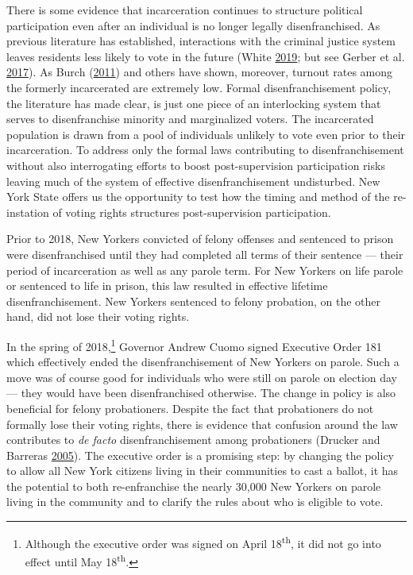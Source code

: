 \documentclass[
  12pt,
]{article}
\begin{document}
There is some evidence that incarceration continues to structure political participation even after an individual is no longer legally disenfranchised. As previous literature has established, interactions with the criminal justice system leaves residents less likely to vote in the future (White \protect\hyperlink{ref-White2019}{2019}; but see Gerber et al. \protect\hyperlink{ref-Gerber2017}{2017}). As Burch (\protect\hyperlink{ref-Burch2011}{2011}) and others have shown, moreover, turnout rates among the formerly incarcerated are extremely low. Formal disenfranchisement policy, the literature has made clear, is just one piece of an interlocking system that serves to disenfranchise minority and marginalized voters. The incarcerated population is drawn from a pool of individuals unlikely to vote even prior to their incarceration. To address only the formal laws contributing to disenfranchisement without also interrogating efforts to boost post-supervision participation risks leaving much of the system of effective disenfranchisement undisturbed. New York State offers us the opportunity to test how the timing and method of the re-instation of voting rights structures post-supervision participation.

Prior to 2018, New Yorkers convicted of felony offenses and sentenced to prison were disenfranchised until they had completed all terms of their sentence --- their period of incarceration as well as any parole term. For New Yorkers on life parole or sentenced to life in prison, this law resulted in effective lifetime disenfranchisement. New Yorkers sentenced to felony probation, on the other hand, did not lose their voting rights.

In the spring of 2018,\footnote{Although the executive order was signed on April 18\textsuperscript{th}, it did not go into effect until May 18\textsuperscript{th}.} Governor Andrew Cuomo signed Executive Order 181 which effectively ended the disenfranchisement of New Yorkers on parole. Such a move was of course good for individuals who were still on parole on election day --- they would have been disenfranchised otherwise. The change in policy is also beneficial for felony probationers. Despite the fact that probationers do not formally lose their voting rights, there is evidence that confusion around the law contributes to \emph{de facto} disenfranchisement among probationers (Drucker and Barreras \protect\hyperlink{ref-Drucker2005}{2005}). The executive order is a promising step: by changing the policy to allow all New York citizens living in their communities to cast a ballot, it has the potential to both re-enfranchise the nearly 30,000 New Yorkers on parole living in the community and to clarify the rules about who is eligible to vote.
\end{document}
